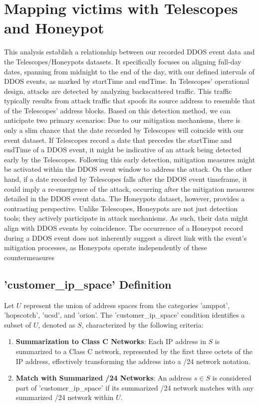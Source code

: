 \section{Mapping victims with Telescopes and Honeypot}\label{sec:mapping_victim}
This analysis establish a relationship between our recorded DDOS event data and the Telescopes/Honeypots datasets. It specifically focuses on aligning full-day dates, spanning from midnight to the end of the day, with our defined intervals of DDOS events, as marked by startTime and endTime. 
In Telescopes' operational design, attacks are detected by analyzing backscattered traffic. This traffic typically results from attack traffic that spoofs its source address to resemble that of the Telescopes' address blocks. Based on this detection method, we can anticipate two primary scenarios:
Due to our mitigation mechanisms, there is only a slim chance that the date recorded by Telescopes will coincide with our event dataset. If Telescopes record a date that precedes the startTime and endTime of a DDOS event, it might be indicative of an attack being detected early by the Telescopes. Following this early detection, mitigation measures might be activated within the DDOS event window to address the attack. On the other hand, if a date recorded by Telescopes falls after the DDOS event timeframe, it could imply a re-emergence of the attack, occurring after the mitigation measures detailed in the DDOS event data.
The Honeypots dataset, however, provides a contrasting perspective. Unlike Telescopes, Honeypots are not just detection tools; they actively participate in attack mechanisms. As such, their data might align with DDOS events by coincidence. The occurrence of a Honeypot record during a DDOS event does not inherently suggest a direct link with the event's mitigation processes, as Honeypots operate independently of these countermeasures

\subsection*{'customer\_ip\_space' Definition}

Let $U$ represent the union of address spaces from the categories 'amppot', 'hopscotch', 'ucsd', and 'orion'. The 'customer\_ip\_space' condition identifies a subset of $U$, denoted as $S$, characterized by the following criteria:

\begin{enumerate}
    \item \textbf{Summarization to Class C Networks}: Each IP address in $S$ is summarized to a Class C network, represented by the first three octets of the IP address, effectively transforming the address into a /24 network notation.
    \item \textbf{Match with Summarized /24 Networks}: An address $s \in S$ is considered part of 'customer\_ip\_space' if its summarized /24 network matches with any summarized /24 network within $U$.
\end{enumerate}

